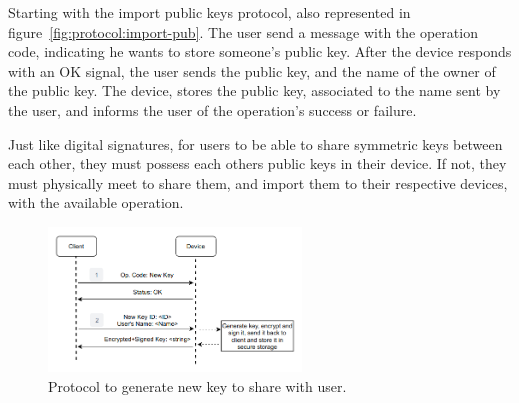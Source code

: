 Starting with the import public keys protocol, also represented in figure~\ref{fig:protocol:import-pub}.
The user send a message with the operation code, indicating he wants to store someone's public key.
After the device responds with an OK signal, the user sends the public key, and the name of the owner of the public key.
The device, stores the public key, associated to the name sent by the user, and informs the user of the operation's success or failure.

Just like digital signatures, for users to be able to share symmetric keys between each other, they must possess each others public keys in their device. If not, they must physically meet to share them, and import them to their respective devices, with the available operation.

\begin{figure}[h]
	\centering
	\includegraphics[width=0.6\textwidth]{./Images/new-key.png}
	\caption{Protocol to generate new key to share with user.}
	\label{fig:protocol:new-key}
\end{figure}

